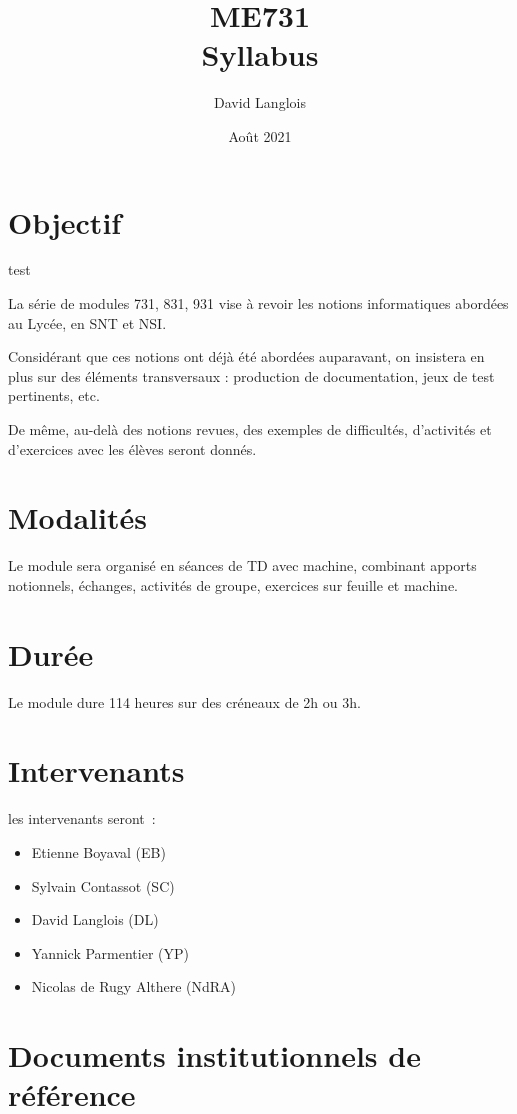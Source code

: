\documentclass[french]{article}
\title{ME731\\Syllabus}
\author{David Langlois}
\date{Août 2021}
\begin{document}
\maketitle

\section{Objectif}

test

La série de modules 731, 831, 931 vise à revoir les notions informatiques abordées au Lycée, en SNT et NSI.

Considérant que ces notions ont déjà été abordées auparavant, on insistera en plus sur des éléments transversaux : production de documentation, jeux de test pertinents, etc.

De même, au-delà des notions revues, des exemples de difficultés, d'activités et d'exercices avec les élèves seront donnés.

\section{Modalités}

Le module sera organisé en séances de TD avec machine, combinant apports notionnels, échanges, activités de groupe, exercices sur feuille et machine.

\section{Durée}

Le module dure 114 heures sur des créneaux de 2h ou 3h.

\section{Intervenants}

les intervenants seront~:

\begin{itemize}
    \item Etienne Boyaval (EB)
    \item Sylvain Contassot (SC)
    \item David Langlois (DL)
    \item Yannick Parmentier (YP)
    \item Nicolas de Rugy Althere (NdRA)
\end{itemize}



\section{Documents institutionnels de référence}
\end{document}
